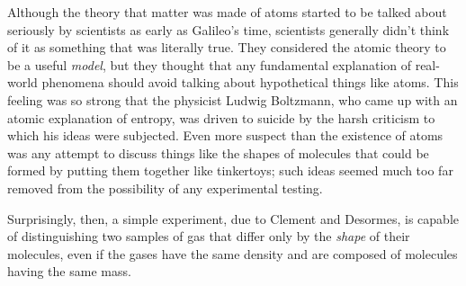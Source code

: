 \label{lab:clement-desormes}

\apparatus
{}

\introduction

Although the theory that matter was made of atoms started to be talked about
seriously by scientists as early as Galileo's time, scientists generally didn't
think of it as something that was literally true. They considered the atomic
theory to be a useful \emph{model}, but they thought that any fundamental explanation of
real-world phenomena should avoid talking about hypothetical things like atoms.
This feeling was so strong that the physicist Ludwig Boltzmann, who came up with
an atomic explanation of entropy, was driven to suicide by the harsh criticism
to which his ideas were subjected. Even more suspect than the existence of
atoms was any attempt to discuss things like the shapes of molecules that could
be formed by putting them together like tinkertoys; such ideas seemed much too far removed
from the possibility of any experimental testing.

Surprisingly, then, a simple experiment, due to Clem\-ent and Desormes, is capable
of distinguishing two samples of gas that differ only by the \emph{shape} of their
molecules, even if the gases have the same density and are composed of
molecules having the same mass.


